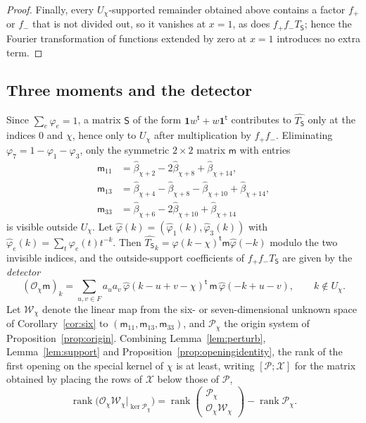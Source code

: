\documentclass{amsart}
\theoremstyle{definition}
\theoremstyle{remark}
\numberwithin{equation}{section}
\DeclareMathOperator{\rank}{rank}
\begin{document}
\begin{proof}
Finally, every $U_\chi$-supported remainder obtained above contains a factor $f_+$ or $f_-$ that
is not divided out, so it vanishes at $x=1$, as does $f_+f_-T_{\mathsf S}$; hence the
Fourier transformation of functions extended by zero at $x=1$ introduces no extra
term.
\end{proof}

\subsection{Three moments and the detector}
Since $\sum_e\varphi_e=1$, a matrix $\mathsf S$ of the form
$\mathbf1w^{\mathsf t}+w\mathbf1^{\mathsf t}$ contributes to $\widehat{T_{\mathsf S}}$
only at the indices $0$ and $\chi$, hence only to $U_\chi$ after multiplication by
$f_+f_-$. Eliminating $\varphi_7=1-\varphi_1-\varphi_3$, only the symmetric
$2\times2$ matrix $\mathsf m$ with entries
\begin{equation}\label{eq:moments}
\begin{aligned}
  \mathsf m_{11}&=\hat\beta_{\chi+2}-2\hat\beta_{\chi+8}+\hat\beta_{\chi+14},\\
  \mathsf m_{13}&=\hat\beta_{\chi+4}-\hat\beta_{\chi+8}-\hat\beta_{\chi+10}
     +\hat\beta_{\chi+14},\\
  \mathsf m_{33}&=\hat\beta_{\chi+6}-2\hat\beta_{\chi+10}+\hat\beta_{\chi+14}
\end{aligned}
\end{equation}
is visible outside $U_\chi$. Let $\hat\varphi(k)=(\hat\varphi_1(k),\hat\varphi_3(k))$ with
$\hat\varphi_e(k)=\sum_t\varphi_e(t)t^{-k}$. Then $\widehat{T_{\mathsf S}}_k=\hat\varphi(k-\chi)^{\mathsf t}
\mathsf m\hat\varphi(-k)$ modulo the two invisible indices, and the outside-support
coefficients of $f_+f_-T_{\mathsf S}$ are given by the \emph{detector}
\begin{equation}\label{eq:detector}
  (\mathcal O_\chi\mathsf m)_k=\sum_{u,v\in F}a_ua_v\,\hat\varphi(k-u+v-\chi)^{\mathsf t}\,
   \mathsf m\,\hat\varphi(-k+u-v),\qquad k\notin U_\chi .
\end{equation}
Let $\mathcal W_\chi$ denote the linear map from the six- or seven-dimensional unknown
space of Corollary~\ref{cor:six} to $(\mathsf m_{11},\mathsf m_{13},\mathsf m_{33})$, and
$\mathcal P_\chi$ the origin system of Proposition~\ref{prop:origin}. Combining
Lemma~\ref{lem:perturb}, Lemma~\ref{lem:support} and
Proposition~\ref{prop:openingidentity}, the rank of the first opening on the special
kernel of $\chi$ is at least, writing $[\mathcal P;\mathcal X]$ for the matrix obtained by
placing the rows of $\mathcal X$ below those of $\mathcal P$,
\begin{equation}\label{eq:openingbound}
  \rank\bigl(\mathcal O_\chi\mathcal W_\chi|_{\ker\mathcal P_\chi}\bigr)
  =\rank\begin{pmatrix}\mathcal P_\chi\\ \mathcal O_\chi\mathcal W_\chi\end{pmatrix}
   -\rank\mathcal P_\chi .
\end{equation}
\end{document}
